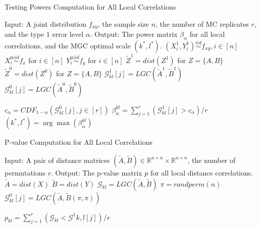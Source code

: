 \documentclass[11pt]{article}
\newcommand{\Real}{\mathbb{R}}
\newcommand{\G}{\mathcal{G}}
\begin{document}
\begin{algorithm}
\caption{Testing Powers Computation for All Local Correlations}
\label{alg3}
\begin{algorithmic}
\State Input: A joint distribution $f_{xy}$, the sample size $n$, the number of MC replicates $r$, and the type $1$ error level $\alpha$.
\State Output: The power matrix $\beta_{\alpha}$ for all local correlations, and the MGC optimal scale $(k^{*},l^{*})$.
\State $(X^{1}_{i},Y^{1}_{i}) \stackrel{iid}{\sim} f_{xy}, i \in [n]$ 
\State $X^{0}_{i} \stackrel{iid}{\sim} f_{x}$ for $i \in [n]$ 
\State $Y^{0}_{i} \stackrel{iid}{\sim} f_{y}$ for $i \in [n]$
\State $\tilde{Z}^{1}=dist(Z^{1})$ for $Z=\{A,B\}$ 
\State $\tilde{Z}^{0}=dist(Z^{0})$ for $Z=\{A,B\}$ 
\State $\G_{kl}^{1}[j]=LGC(\tilde{A}^{1},\tilde{B}^{1})$  
\State $\G_{kl}^{0}[j]=LGC(\tilde{A}^{0},\tilde{B}^{0})$  
\EndFor

\State $c_{\alpha}=CDF_{1-\alpha}(\G^{0}_{kl}[j],j \in [r])$ 
\State $\beta_{\alpha}^{kl}=\sum_{j=1}^{r}(\G^{1}_{kl}[j]>c_{\alpha}) / r$ 
\EndFor
\State $(k^{*},l^{*})=\arg\max(\beta_{\alpha}^{kl})$ 
\EndFunction
\end{algorithmic}
\end{algorithm}

\begin{algorithm}
\caption{P-value Computation for All Local Correlations}
\label{alg4}
\begin{algorithmic}
\State Input: A pair of distance matrices $(\tilde{A},\tilde{B}) \in \Real^{n \times n} \times \Real^{n \times n}$, the number of permutations $r$.
\State Output: The p-value matrix $p$ for all local distance correlations.
\State $\tilde{A}=dist(X)$
\State $\tilde{B}=dist(Y)$
\State $\G_{kl}=LGC(\tilde{A},\tilde{B})$ 
\State $\pi=randperm(n)$ 
\State $\G_{kl}^{0}[j]=LGC(\tilde{A},\tilde{B}(\pi,\pi))$ 
\EndFor

\State $p_{kl}=\sum_{j=1}^{r}(\G_{kl}<\G^{1}{k,l}[j])/r$ 
\EndFor
\EndFunction
\end{algorithmic}
\end{algorithm}
\end{document}
